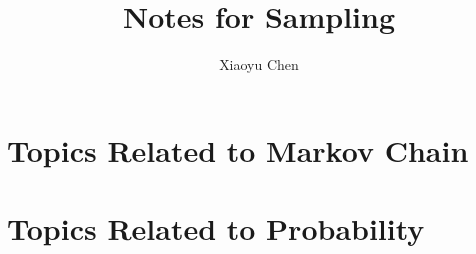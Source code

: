 \documentclass{tufte-book}
\title{\Huge Notes for Sampling}
\author{Xiaoyu Chen}
\begin{document}
\maketitle
\tableofcontents
\clearpage

\chapter{Topics Related to Markov Chain}
\clearpage

















\chapter{Topics Related to Probability}
\clearpage












\end{document}
